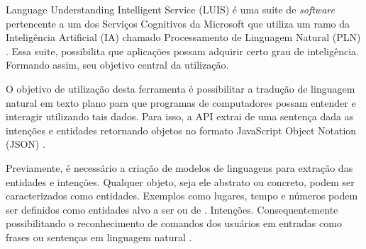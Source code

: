 Language Understanding Intelligent Service (LUIS) é uma suite de \textit{software} pertencente a um dos Serviços Cognitivos da Microsoft que utiliza um ramo da Inteligência Artificial (IA) chamado Processamento de Linguagem Natural (PLN) \cite{Mayo:2017}. Essa suite, possibilita que aplicações possam adquirir certo grau de inteligência. Formando assim, seu objetivo central da utilização.

O objetivo de utilização desta ferramenta é possibilitar a tradução de linguagem natural em texto plano para que programas de computadores possam entender e interagir utilizando tais dados. Para isso, a API extrai de uma sentença dada as intenções e entidades retornando objetos no formato JavaScript Object Notation (JSON) \cite{Mayo:2017}.

Previamente, é necessário a criação de modelos de linguagens para extração das entidades e intenções. Qualquer objeto, seja ele abstrato ou concreto, podem ser caracterizados como entidades. Exemplos como lugares, tempo e números podem ser definidos como entidades alvo a ser ou de . Intenções.  Consequentemente possibilitando o reconhecimento de comandos dos usuários em entradas como frases ou sentenças em linguagem natural \cite{Larsen:2017}.
